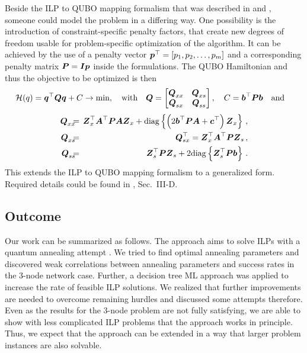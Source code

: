 \documentclass[utf8, nocrop]{FrontiersinHarvardArxiv}
\def\diag{\mathrm{diag}}
\def\ve#1{\mathlette{\boldmath}{#1}}
\def\mathlette#1#2{{\mathchoice{\mbox{#1$\displaystyle #2$}}%
        {\mbox{#1$\textstyle #2$}}%
        {\mbox{#1$\scriptstyle #2$}}%
        {\mbox{#1$\scriptscriptstyle #2$}}}}
\begin{document}
Beside the ILP to QUBO mapping formalism that was described in \cite{Chang:2020iwh} and \cite{Witt:2022lsx}, someone could model the problem in a differing way. One possibility is the introduction of constraint-specific penalty factors, that create new degrees of freedom usable for problem-specific optimization of the algorithm. It can be achieved by the use of a penalty vector $	\ve{p}^\top=[p_1,p_2,\ldots,p_m] $
and a corresponding penalty matrix $\ve{P}=\ve{I}\ve{p}$ inside the formulations. The QUBO Hamiltonian and thus the objective to be optimized is then
\def\Qxx{\ve{Q}_{xx}}
\def\Qxs{\ve{Q}_{xs}}
\def\Qsx{\ve{Q}_{sx}}
\def\Qss{\ve{Q}_{ss}}
\def\Zx{\ve{Z}_{x}}
\def\Zs{\ve{Z}_{s}}
\begin{equation}
	\mathcal{H}(q)=\ve{q}^\top\ve{Qq}+C \rightarrow\text{min}, \quad\text{with}\quad
	\ve{Q}=
	\begin{bmatrix}
		\Qxx & \Qxs \\
		\Qsx & \Qss \\
	\end{bmatrix}
	,\quad C= \ve{b}^\top\ve{Pb}\quad\text{and}\quad\nonumber
\end{equation}\vspace{-0.5cm}
\begin{eqnarray}
	\Qxx&\hspace{-2mm}=\hspace{-2mm}&\Zx^\top \ve A^\top \ve P \ve A \Zx + \diag\left\{\left(2\ve{b}^\top \ve P\ve A +\ve{c}^\top\right) \Zx    \right\}\,,
	\nonumber\\
	\Qxs&\hspace{-2mm}=\hspace{-2mm}&\Qsx^\top=\Zx^\top \ve A^\top \ve P \Zs\,,
	\nonumber\\
	\Qss&\hspace{-2mm}=\hspace{-2mm}&\Zs^\top \ve P \Zs+2\diag\left\{\Zs^\top \ve P \ve{b} \right\}\,.
	\label{eq:qubo_matrix}
\end{eqnarray}
This extends the ILP to QUBO mapping formalism to a generalized form. Required details could be found in \cite{Witt:2022lsx}, Sec.~III-D. 

\subsection{Outcome}
Our work can be summarized as follows. The approach aims to solve ILPs with a quantum annealing attempt . We tried to find optimal annealing parameters and discovered weak correlations between annealing parameters and success rates in the 3-node network case. Further, a decision tree ML approach was applied to increase the rate of feasible ILP solutions. We realized that further improvements are needed to overcome remaining hurdles and discussed some attempts therefore. Even as the results for the 3-node problem are not fully satisfying, we are able to show with less complicated ILP problems that the approach works in principle. Thus, we expect that the approach can be extended in a way that larger problem instances are also solvable.
\end{document}
